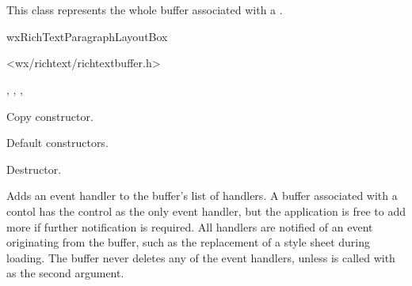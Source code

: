 \section{}\label{wxrichtextbuffer}

This class represents the whole buffer associated with a .


wxRichTextParagraphLayoutBox


<wx/richtext/richtextbuffer.h>



, , , 


\label{wxrichtextbufferwxrichtextbuffer}


Copy constructor.


Default constructors.

\label{wxrichtextbufferdtor}


Destructor.

\label{wxrichtextbufferaddeventhandler}


Adds an event handler to the buffer's list of handlers. A buffer associated with
a contol has the control as the only event handler, but the application is free
to add more if further notification is required. All handlers are notified
of an event originating from the buffer, such as the replacement of a style sheet
during loading. The buffer never deletes any of the event handlers, unless 
 is
called with \true as the second argument.

\label{wxrichtextbufferaddhandler}

